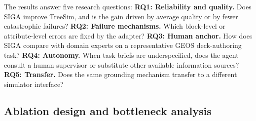 \documentclass{article}
\begin{document}
The results answer five research questions:
\textbf{RQ1: Reliability and quality.} Does SIGA improve TreeSim, and is the gain driven by average quality or by fewer catastrophic failures?
\textbf{RQ2: Failure mechanisms.} Which block-level or attribute-level errors are fixed by the adapter?
\textbf{RQ3: Human anchor.} How does SIGA compare with domain experts on a representative GEOS deck-authoring task?
\textbf{RQ4: Autonomy.} When task briefs are underspecified, does the agent consult a human supervisor or substitute other available information sources?
\textbf{RQ5: Transfer.} Does the same grounding mechanism transfer to a different simulator interface?






\subsection{Ablation design and bottleneck analysis}
\label{subsec:cells}
\end{document}

